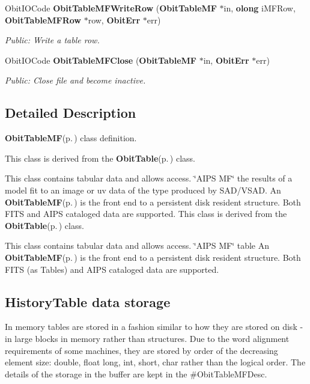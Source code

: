 \begin{CompactItemize}
Obit\-IOCode {\bf Obit\-Table\-MFWrite\-Row} ({\bf Obit\-Table\-MF} $\ast$in, {\bf olong} i\-MFRow, {\bf Obit\-Table\-MFRow} $\ast$row, {\bf Obit\-Err} $\ast$err)
\begin{CompactList}\small\item\em Public: Write a table row. \item\end{CompactList}\item 
Obit\-IOCode {\bf Obit\-Table\-MFClose} ({\bf Obit\-Table\-MF} $\ast$in, {\bf Obit\-Err} $\ast$err)
\begin{CompactList}\small\item\em Public: Close file and become inactive. \item\end{CompactList}\end{CompactItemize}


\subsection{Detailed Description}
{\bf Obit\-Table\-MF}{\rm (p.\,\pageref{structObitTableMF})} class definition. 

This class is derived from the {\bf Obit\-Table}{\rm (p.\,\pageref{structObitTable})} class.

This class contains tabular data and allows access. \char`\"{}AIPS MF\char`\"{} the results of a model fit to an image or uv data of the type produced by SAD/VSAD. An {\bf Obit\-Table\-MF}{\rm (p.\,\pageref{structObitTableMF})} is the front end to a persistent disk resident structure. Both FITS and AIPS cataloged data are supported. This class is derived from the {\bf Obit\-Table}{\rm (p.\,\pageref{structObitTable})} class.

This class contains tabular data and allows access. \char`\"{}AIPS MF\char`\"{} table An {\bf Obit\-Table\-MF}{\rm (p.\,\pageref{structObitTableMF})} is the front end to a persistent disk resident structure. Both FITS (as Tables) and AIPS cataloged data are supported.\subsection{History\-Table data storage}\label{ObitTableWX_8h_TableDataStorage}
In memory tables are stored in a fashion similar to how they are stored on disk - in large blocks in memory rather than structures. Due to the word alignment requirements of some machines, they are stored by order of the decreasing element size: double, float long, int, short, char rather than the logical order. The details of the storage in the buffer are kept in the \#Obit\-Table\-MFDesc.

